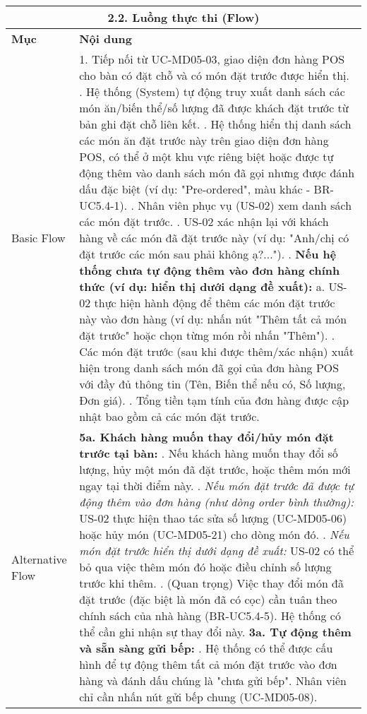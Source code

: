 \begin{longtable}{|m{4cm}|p{11cm}|}
\hline
\multicolumn{2}{|c|}{\textbf{2.2. Luồng thực thi (Flow)}} \\
\hline
\textbf{Mục} & \textbf{Nội dung} \\
\hline
Basic Flow & 1. Tiếp nối từ UC-MD05-03, giao diện đơn hàng POS cho bàn có đặt chỗ và có món đặt trước được hiển thị. \newline 2. Hệ thống (System) tự động truy xuất danh sách các món ăn/biến thể/số lượng đã được khách đặt trước từ bản ghi đặt chỗ liên kết. \newline 3. Hệ thống hiển thị danh sách các món ăn đặt trước này trên giao diện đơn hàng POS, có thể ở một khu vực riêng biệt hoặc được tự động thêm vào danh sách món đã gọi nhưng được đánh dấu đặc biệt (ví dụ: "Pre-ordered", màu khác - BR-UC5.4-1). \newline 4. Nhân viên phục vụ (US-02) xem danh sách các món đặt trước. \newline 5. US-02 xác nhận lại với khách hàng về các món đã đặt trước này (ví dụ: "Anh/chị có đặt trước các món sau phải không ạ?..."). \newline 6. \textbf{Nếu hệ thống chưa tự động thêm vào đơn hàng chính thức (ví dụ: hiển thị dưới dạng đề xuất):} \newline    a. US-02 thực hiện hành động để thêm các món đặt trước này vào đơn hàng (ví dụ: nhấn nút "Thêm tất cả món đặt trước" hoặc chọn từng món rồi nhấn "Thêm"). \newline 7. Các món đặt trước (sau khi được thêm/xác nhận) xuất hiện trong danh sách món đã gọi của đơn hàng POS với đầy đủ thông tin (Tên, Biến thể nếu có, Số lượng, Đơn giá). \newline 8. Tổng tiền tạm tính của đơn hàng được cập nhật bao gồm cả các món đặt trước. \\
\hline
Alternative Flow & \textbf{5a. Khách hàng muốn thay đổi/hủy món đặt trước tại bàn:} \newline    1. Nếu khách hàng muốn thay đổi số lượng, hủy một món đã đặt trước, hoặc thêm món mới ngay tại thời điểm này. \newline    2. \textit{Nếu món đặt trước đã được tự động thêm vào đơn hàng (như dòng order bình thường):} US-02 thực hiện thao tác sửa số lượng (UC-MD05-06) hoặc hủy món (UC-MD05-21) cho dòng món đó. \newline    3. \textit{Nếu món đặt trước hiển thị dưới dạng đề xuất:} US-02 có thể bỏ qua việc thêm món đó hoặc điều chỉnh số lượng trước khi thêm. \newline    4. (Quan trọng) Việc thay đổi món đã đặt trước (đặc biệt là món đã có cọc) cần tuân theo chính sách của nhà hàng (BR-UC5.4-5). Hệ thống có thể cần ghi nhận sự thay đổi này. \newline \textbf{3a. Tự động thêm và sẵn sàng gửi bếp:} \newline    1. Hệ thống có thể được cấu hình để tự động thêm tất cả món đặt trước vào đơn hàng và đánh dấu chúng là "chưa gửi bếp". Nhân viên chỉ cần nhấn nút gửi bếp chung (UC-MD05-08). \\

\end{longtable}
